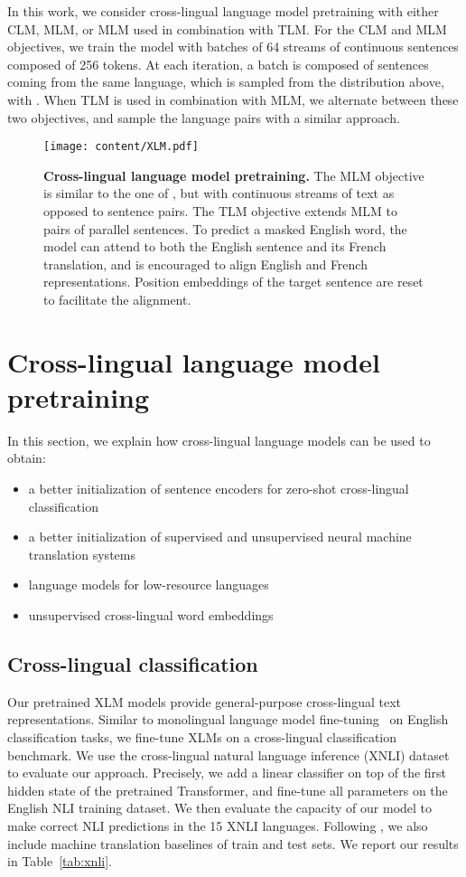 \documentclass[11pt,a4paper]{article}
\begin{document}
In this work, we consider cross-lingual language model pretraining with either CLM, MLM, or MLM used in combination with TLM. For the CLM and MLM objectives, we train the model with batches of 64 streams of continuous sentences composed of 256 tokens. At each iteration, a batch is composed of sentences coming from the same language, which is sampled from the distribution  above, with . When TLM is used in combination with MLM, we alternate between these two objectives, and sample the language pairs with a similar approach.

\begin{figure*}[h!]
\texttt{[image: content/XLM.pdf]}
\caption{\small \textbf{Cross-lingual language model pretraining. } The MLM objective is similar to the one of \citet{devlin2018bert}, but with continuous streams of text as opposed to sentence pairs. The TLM objective extends MLM to pairs of parallel sentences. To predict a masked English word, the model can attend to both the English sentence and its French translation, and is encouraged to align English and French representations. Position embeddings of the target sentence are reset to facilitate the alignment.}
    \label{fig:xlm}
\end{figure*}

\section{Cross-lingual language model pretraining}
In this section, we explain how cross-lingual language models can be used to obtain:
\begin{itemize}
    \item a better initialization of sentence encoders for zero-shot cross-lingual classification
    \item a better initialization of supervised and unsupervised neural machine translation systems
    \item language models for low-resource languages
    \item unsupervised cross-lingual word embeddings
\end{itemize}

\subsection{Cross-lingual classification}
Our pretrained XLM models provide general-purpose cross-lingual text representations. Similar to monolingual language model fine-tuning~\cite{radford2018improving,devlin2018bert} on English classification tasks, we fine-tune XLMs on a cross-lingual classification benchmark. We use the cross-lingual natural language inference (XNLI) dataset to evaluate our approach. Precisely, we add a linear classifier on top of the first hidden state of the pretrained Transformer, and fine-tune all parameters on the English NLI training dataset. We then evaluate the capacity of our model to make correct NLI predictions in the 15 XNLI languages. Following \citet{conneau2018xnli}, we also include machine translation baselines of train and test sets. We report our results in Table~\ref{tab:xnli}.
\end{document}
